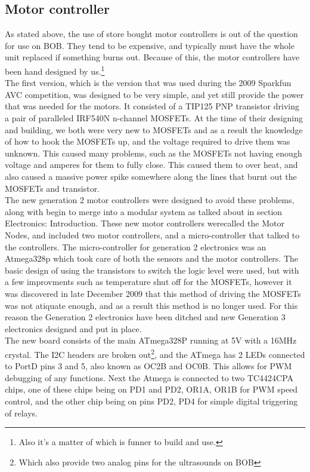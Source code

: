 \documentclass{article}
\begin{document}
\subsection{Motor controller}
As stated above, the use of store bought motor controllers is out of the question for use on BOB. They tend to be expensive, and typically must have the whole unit replaced if something burns out. Because of this, the motor controllers have been hand designed by us.\footnote{Also it's a matter of which is funner to build and use.}\\
The first version, which is the version that was used during the 2009 Sparkfun AVC competition, was designed to be very simple, and yet still provide the power that was needed for the motors. It consisted of a TIP125 PNP transistor driving a pair of paralleled IRF540N n-channel MOSFETs. At the time of their designing and building, we both were very new to MOSFETs and as a result the knowledge of how to hook the MOSFETs up, and the voltage required to drive them was unknown. This caused many problems, such as the MOSFETs not having enough voltage and amperes for them to fully close. This caused them to over heat, and also caused a massive power spike somewhere along the lines that burnt out the MOSFETs and transistor.\\
The new generation 2 motor controllers were designed to avoid these problems, along with begin to merge into a modular system as talked about in section Electronics: Introduction. These new motor controllers werecalled the Motor Nodes, and included two motor controllers, and a micro-controller that talked to the controllers. The micro-controller for generation 2 electronics was an Atmega328p which took care of both the sensors and the motor controllers. The basic design of using the transistors to switch the logic level were used, but with a few improvments such as temperature shut off for the MOSFETs, however it was discovered in late December 2009 that this method of driving the MOSFETs was not atiquate enough, and as a result this method is no longer used. For this reason the Generation 2 electronics have been ditched and new Generation 3 electronics designed and put in place.\\
The new board consists of the main ATmega328P running at 5V with a 16MHz crystal. The I2C headers are broken out\footnote{Which also provide two analog pins for the ultrasounds on BOB}, and the ATmega has 2 LEDs connected to PortD pins 3 and 5, also known as OC2B and OC0B. This allows for PWM debugging of any functions. Next the Atmega is connected to two TC4424CPA chips, one of these chips being on PD1 and PD2, OR1A, OR1B for PWM speed control, and the other chip being on pins PD2, PD4 for simple digital triggering of relays.\\
\end{document}
